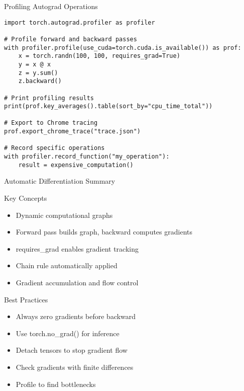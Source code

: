 \documentclass[aspectratio=169,10pt]{beamer}
\begin{document}
\begin{frame}[fragile]{Profiling Autograd Operations}
\begin{lstlisting}
import torch.autograd.profiler as profiler

# Profile forward and backward passes
with profiler.profile(use_cuda=torch.cuda.is_available()) as prof:
    x = torch.randn(100, 100, requires_grad=True)
    y = x @ x
    z = y.sum()
    z.backward()

# Print profiling results
print(prof.key_averages().table(sort_by="cpu_time_total"))

# Export to Chrome tracing
prof.export_chrome_trace("trace.json")

# Record specific operations
with profiler.record_function("my_operation"):
    result = expensive_computation()
\end{lstlisting}
\end{frame}

\begin{frame}{Automatic Differentiation Summary}
\begin{block}{Key Concepts}
\begin{itemize}
    \item Dynamic computational graphs
    \item Forward pass builds graph, backward computes gradients
    \item requires\_grad enables gradient tracking
    \item Chain rule automatically applied
    \item Gradient accumulation and flow control
\end{itemize}
\end{block}

\begin{alertblock}{Best Practices}
\begin{itemize}
    \item Always zero gradients before backward
    \item Use torch.no\_grad() for inference
    \item Detach tensors to stop gradient flow
    \item Check gradients with finite differences
    \item Profile to find bottlenecks
\end{itemize}
\end{alertblock}
\end{frame}
\end{document}
